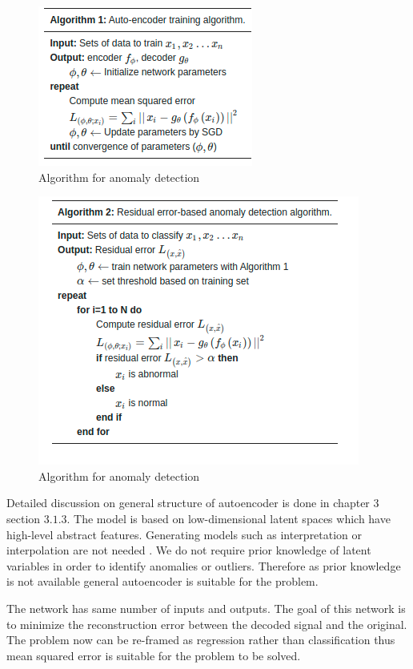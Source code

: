     \begin{figure}[h]
    	\centering
    	\includegraphics[width=0.5\linewidth]{images/algau.png}
    	\caption{Algorithm for anomaly detection \cite{oh2018residual} }
    	\label{nv0}
    \end{figure}
    
     \begin{figure}[h]
     	\centering
     	\includegraphics[width=0.75\linewidth]{images/rsd.png}
     	\caption{Algorithm for anomaly detection \cite{oh2018residual} }
     	\label{n00}
     \end{figure}
   
   Detailed discussion on general structure of autoencoder is done in chapter 3 section $3.1.3$. The model is based on low-dimensional latent spaces which have high-level abstract features. Generating models such as interpretation or interpolation are not needed \cite{oh2018residual}. We do not require prior knowledge of latent variables in order to identify anomalies or outliers. Therefore as prior knowledge is not available general autoencoder is suitable for the problem.
   
   The network has same number of inputs and outputs. The goal of this network is to minimize the reconstruction error between the decoded signal and the original. The problem now can be re-framed as regression rather than classification thus mean squared error is suitable for the problem to be solved.     
   
